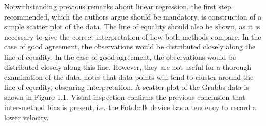 \documentclass[12pt, a4paper]{report}
\theoremstyle{plain}
\theoremstyle{definition}
\theoremstyle{remark}
\begin{document}
Notwithstanding previous remarks about linear regression, the first step recommended, which the authors argue should be mandatory, is construction of a simple scatter plot of the data. The line of equality should also be shown, as it is necessary to give the correct interpretation of how both methods compare. In the case of good agreement, the observations would be distributed closely along the line of equality. In the case of good agreement, the observations would be distributed closely along this line. However, they are not useful for a thorough examination of the data. \citet{BritHypSoc} notes that data points will tend to cluster around the line of equality, obscuring interpretation. A scatter plot of the Grubbs data is shown in Figure 1.1. Visual inspection confirms the previous conclusion that inter-method bias is present, i.e. the Fotobalk device has a tendency to record a lower velocity.
	
\end{document}
